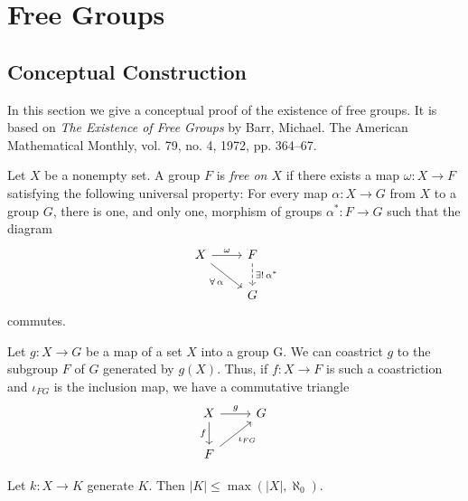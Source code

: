 \chapter{Free Groups}

\section{Conceptual Construction}

In this section we give a conceptual proof of the existence of free groups. It is based on \textit{The Existence of Free Groups} by Barr, Michael. The American Mathematical Monthly, vol. 79, no. 4, 1972, pp. 364–67.

\begin{defn}\label{defn:free-group}
    Let\/ $X$ be a nonempty set. A group\/ $F$ is \textsl{free on $X$ } if there exists a map\/ $\omega\colon X\to F$ satisfying the following universal property: For every map\/ $\alpha\colon X\to G$ from $X$ to a group $G$, there is one, and only one, morphism of groups\/ $\alpha^*\colon F\to G$ such that the diagram
    $$
        \begin{tikzcd}
            X \arrow[r, "\omega"] \arrow[rd, "\forall\,\alpha"']
                & F \arrow[d, "\exists!\,\alpha^*", dashed] \\
                & G
        \end{tikzcd}
    $$
    commutes.
\end{defn}

\begin{rem}\label{rem:free-group-prop1}
     Let\/ $g\colon X\to G$ be a map of a set\/ $X$ into a group G. We can coastrict $g$ to the subgroup\/ $F$ of\/ $G$ generated by $g(X)$. Thus, if\/ $f\colon X\to F$ is such a coastriction and\/ $\iota_{FG}$ is the inclusion map, we have a commutative triangle
     $$
        \begin{tikzcd}
            X
                    \arrow[r,"g"]
                    \arrow[d,"f"']
                &G\\
            F
                    \arrow[ru,"\iota_{FG}"']
        \end{tikzcd}
     $$
\end{rem}

\begin{lem}\label{lem:free-group-lemma3.1}
    Let $k\colon X\to K$ generate $K$. Then $|K|\le\max(|X|,\aleph_0)$.
\end{lem}

